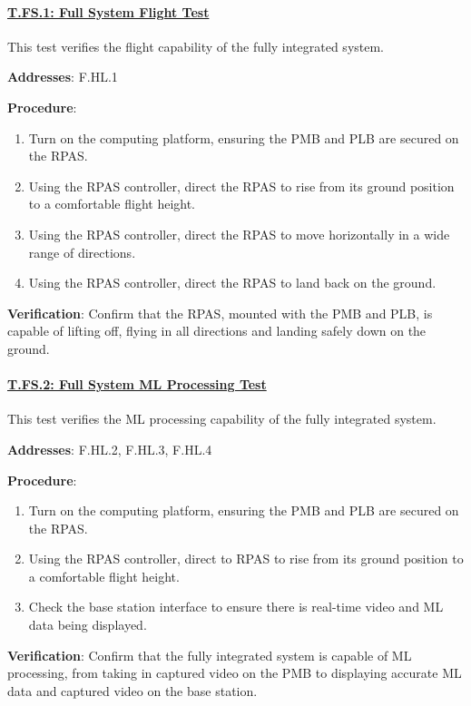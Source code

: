 \paragraph{\underline{T.FS.1: Full System Flight Test}}

This test verifies the flight capability of the fully integrated system.

\textbf{Addresses}: F.HL.1

\textbf{Procedure}:
\begin{enumerate}[noitemsep]
    \item Turn on the computing platform, ensuring the PMB and PLB are secured on the RPAS.
    \item Using the RPAS controller, direct the RPAS to rise from its ground position to a comfortable flight height.
    \item Using the RPAS controller, direct the RPAS to move horizontally in a wide range of directions.
    \item Using the RPAS controller, direct the RPAS to land back on the ground.
\end{enumerate}

\textbf{Verification}:
Confirm that the RPAS, mounted with the PMB and PLB, is capable of lifting off, flying in all directions and landing safely down on the ground.

%

\paragraph{\underline{T.FS.2: Full System ML Processing Test}}

This test verifies the ML processing capability of the fully integrated system.

\textbf{Addresses}: F.HL.2, F.HL.3, F.HL.4

\textbf{Procedure}:
\begin{enumerate}[noitemsep]
    \item Turn on the computing platform, ensuring the PMB and PLB are secured on the RPAS.
    \item Using the RPAS controller, direct to RPAS to rise from its ground position to a comfortable flight height.
    \item Check the base station interface to ensure there is real-time video and ML data being displayed.
\end{enumerate}

\textbf{Verification}:
Confirm that the fully integrated system is capable of ML processing, from taking in captured video on the PMB to displaying accurate ML data and captured video on the base station.